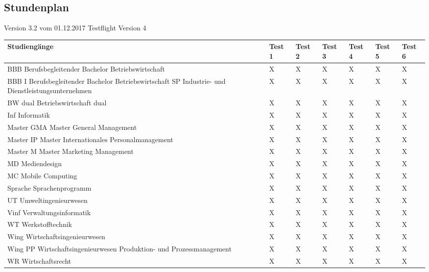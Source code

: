 \subsection{Stundenplan}
Version 3.2 vom 01.12.2017 Testflight Version 4\newline
\noindent%
\begin{tabularx}{\textwidth}{|p{}|X|X|X|X|X|X| }
\hline
\textbf{Studiengänge} &\textbf{Test 1} &\textbf{Test 2} &\textbf{Test 3}&\textbf{Test 4} &\textbf{Test 5} &\textbf{Test 6}  \\ \hline 

BBB  Berufsbegleitender Bachelor Betriebswirtschaft & X & X & X & X & X & X  \\ \hline
BBB I  Berufsbegleitender Bachelor Betriebswirtschaft SP Industrie- und Dienstleistungsunternehmen & X & X & X & X & X & X  \\ \hline
BW dual  Betriebswirtschaft dual & X & X & X & X & X & X  \\ \hline
Inf  Informatik & X & X & X & X & X & X  \\ \hline
Master GMA  Master General Management & X & X & X & X & X & X  \\ \hline
Master IP  Master Internationales Personalmanagement & X & X & X & X & X & X  \\ \hline
Master M  Master Marketing Management & X & X & X & X & X & X  \\ \hline
MD  Mediendesign & X & X & X & X & X & X  \\ \hline
MC  Mobile Computing & X & X & X & X & X & X  \\ \hline
Sprache  Sprachenprogramm & X & X & X & X & X & X  \\ \hline
UT  Umweltingenieurwesen & X & X & X & X & X & X  \\ \hline
Vinf  Verwaltungsinformatik & X & X & X & X & X & X  \\ \hline
WT  Werkstofftechnik & X & X & X & X & X & X  \\ \hline
Wing  Wirtschaftsingenieurwesen & X & X & X & X & X & X  \\ \hline
Wing PP Wirtschaftsingenieurwesen Produktion- und Prozessmanagement & X & X & X & X & X & X  \\ \hline
WR  Wirtschaftsrecht & X & X & X & X & X & X  \\ \hline
\end{tabularx}
 \newline
\newline

